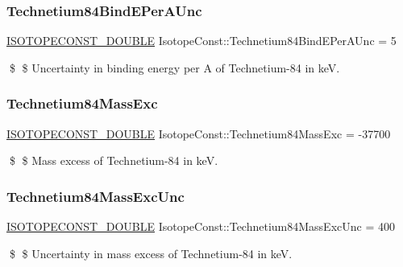 \subsubsection{\texorpdfstring{Technetium84\+Bind\+E\+Per\+A\+Unc}{Technetium84BindEPerAUnc}}
{\footnotesize\ttfamily \mbox{\hyperlink{group___isotope_const-_macros_ga8f45a7272ce02c0b4c65c44636ed719a}{I\+S\+O\+T\+O\+P\+E\+C\+O\+N\+S\+T\+\_\+\+D\+O\+U\+B\+LE}} Isotope\+Const\+::\+Technetium84\+Bind\+E\+Per\+A\+Unc = 5}

\$ \$ Uncertainty in binding energy per A of Technetium-\/84 in keV. \mbox{\label{group___isotope_const-_technetium-_tc84_ga52dd0b49c9615fb28cd341b2f66316e6}} 
\subsubsection{\texorpdfstring{Technetium84\+Mass\+Exc}{Technetium84MassExc}}
{\footnotesize\ttfamily \mbox{\hyperlink{group___isotope_const-_macros_ga8f45a7272ce02c0b4c65c44636ed719a}{I\+S\+O\+T\+O\+P\+E\+C\+O\+N\+S\+T\+\_\+\+D\+O\+U\+B\+LE}} Isotope\+Const\+::\+Technetium84\+Mass\+Exc = -\/37700}

\$ \$ Mass excess of Technetium-\/84 in keV. \mbox{\label{group___isotope_const-_technetium-_tc84_ga3e3c1e0646f5732c2284b86143b64eb6}} 
\subsubsection{\texorpdfstring{Technetium84\+Mass\+Exc\+Unc}{Technetium84MassExcUnc}}
{\footnotesize\ttfamily \mbox{\hyperlink{group___isotope_const-_macros_ga8f45a7272ce02c0b4c65c44636ed719a}{I\+S\+O\+T\+O\+P\+E\+C\+O\+N\+S\+T\+\_\+\+D\+O\+U\+B\+LE}} Isotope\+Const\+::\+Technetium84\+Mass\+Exc\+Unc = 400}

\$ \$ Uncertainty in mass excess of Technetium-\/84 in keV. \mbox{\label{group___isotope_const-_technetium-_tc84_ga5d8baa61c77b5664bbbb927e09a1a745}} 
